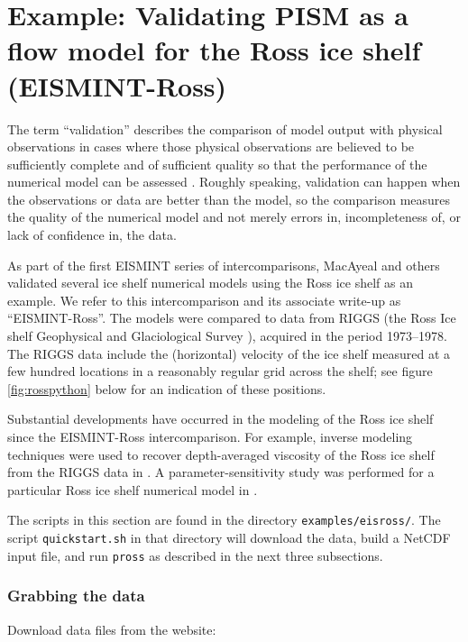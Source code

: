 
\section{Example: Validating PISM as a flow model for the Ross ice shelf (EISMINT-Ross)}\label{sect:ross}    

The term ``validation'' describes the comparison of model output with physical observations in cases where those physical observations are believed to be sufficiently complete and of sufficient quality so that the performance of the numerical model can be assessed \cite{Roache,Wesseling}.  Roughly speaking, validation can happen when the observations or data are better than the model, so the comparison measures the quality of the numerical model and not merely errors in, incompleteness of, or lack of confidence in, the data.

As part of the first EISMINT series of intercomparisons, MacAyeal and others \cite{MacAyealetal} validated several ice shelf numerical models using the Ross ice shelf as an example.  We refer to this intercomparison and its associate write-up \cite{MacAyealetal} as ``EISMINT-Ross''.  The models were compared to data from RIGGS (the Ross Ice shelf Geophysical and Glaciological Survey \cite{RIGGS2,RIGGS1}), acquired in the period 1973--1978.   The RIGGS data include the (horizontal) velocity of the ice shelf measured at a few hundred locations in a reasonably regular grid across the shelf; see figure \ref{fig:rosspython} below for an indication of these positions.

Substantial developments have occurred in the modeling of the Ross ice shelf since the EISMINT-Ross intercomparison.  For example, inverse modeling techniques were used to recover depth-averaged viscosity of the Ross ice shelf from the RIGGS data in \cite{RommelaereMacAyeal}. A parameter-sensitivity study was performed for a particular Ross ice shelf numerical model in \cite{HumbertGreveHutter}.

The scripts in this section are found in the directory \texttt{examples/eisross/}.  The script \texttt{quickstart.sh} in that directory will download the data, build a NetCDF input file, and run \texttt{pross} as described in the next three subsections.

\subsubsection*{Grabbing the data}  Download data files from the website:

